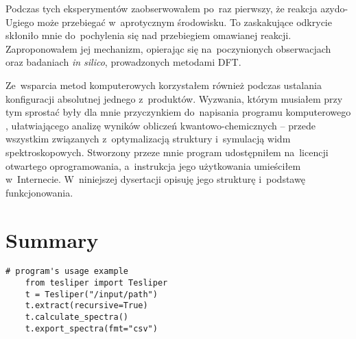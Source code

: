 Podczas tych eksperymentów zaobserwowałem po~raz pierwszy, że reakcja azydo-Ugiego może
  przebiegać w~aprotycznym środowisku.
To zaskakujące odkrycie skłoniło mnie do~pochylenia się nad przebiegiem omawianej reakcji.
Zaproponowałem jej mechanizm, opierając się na~poczynionych obserwacjach oraz badaniach
  \textit{in silico}, prowadzonych metodami DFT.

Ze~wsparcia metod komputerowych korzystałem również podczas ustalania konfiguracji absolutnej
  jednego z~produktów.
Wyzwania, którym musiałem przy tym sprostać były dla mnie przyczynkiem do~napisania programu
  komputerowego \tesliper{}, ułatwiającego analizę wyników obliczeń kwantowo-chemicznych \---
  przede wszystkim związanych z~optymalizacją struktury i~symulacją widm spektroskopowych.
Stworzony przeze mnie program udostępniłem na~licencji otwartego
  oprogramowania, a~instrukcja jego użytkowania umieściłem w~Internecie.
W~niniejszej dysertacji opisuję jego strukturę i~podstawę funkcjonowania.


\chapter{Summary}\label{chapter:summary:en}
\begin{marginscheme}
  
\end{marginscheme}
\begin{marginfigure}
  
\end{marginfigure}
\begin{marginlisting}
  \begin{lstlisting}[emph={recursive,fmt},numbers=none]
    # program's usage example
    from tesliper import Tesliper
    t = Tesliper("/input/path")
    t.extract(recursive=True)
    t.calculate_spectra()
    t.export_spectra(fmt="csv")
  \end{lstlisting}
\end{marginlisting}


